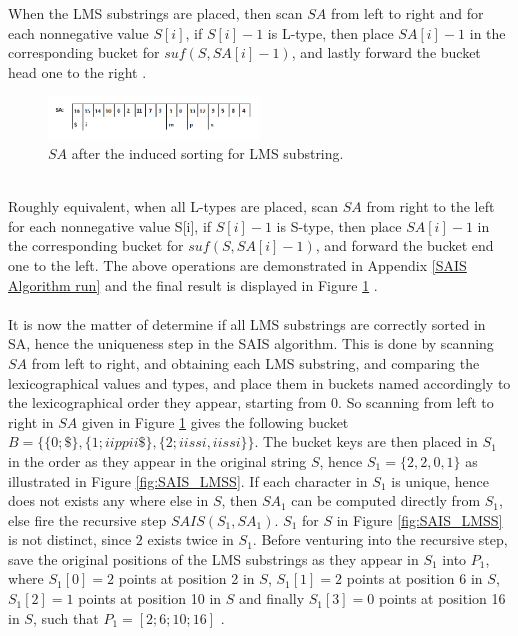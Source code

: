 \documentclass[12pt]{article} %
\begin{document}
When the LMS substrings are placed, then scan $SA$ from left to right and for each nonnegative value $S[i]$, if $S[i]-1$ is L-type, then place $SA[i]-1$ in the corresponding bucket for $suf(S, SA[i]-1)$, and lastly forward the bucket head one to the right \cite{twoeffecient}. 
\begin{figure}[H]
    \centering
    \includegraphics[width=0.5\textwidth]{SAIS_LMSfinal}
    \captionsetup{width=0.8\textwidth}
    \caption{$SA$ after the induced sorting for LMS substring.}
    \label{fig:SAIS_LMSfinal}
    
\end{figure}
\\
Roughly equivalent, when all L-types are placed, scan $SA$ from right to the left for each nonnegative value S[i], if $S[i]-1$ is S-type, then place $SA[i]-1$ in the corresponding bucket for $suf(S, SA[i]-1)$, and forward the bucket end one to the left. The above operations are demonstrated in Appendix \ref{SAIS Algorithm run} and the final result is displayed in Figure \ref{fig:SAIS_LMSfinal} \cite{twoeffecient}.
\\ \\
It is now the matter of determine if all LMS substrings are correctly sorted in SA, hence the uniqueness step in the SAIS algorithm. This is done by scanning $SA$ from left to right, and obtaining each LMS substring, and comparing the lexicographical values and types, and place them in buckets named accordingly to the lexicographical order they appear, starting from 0. So scanning from left to right in $SA$ given in Figure \ref{fig:SAIS_LMSfinal} gives the following bucket $B = \{\{0; \$\}, \{1; iippii\$\}, \{2; iissi, iissi\}\}$. The bucket keys are then placed in $S_1$ in the order as they appear in the original string $S$, hence $S_1 = \{2,2,0,1\}$ as illustrated in Figure \ref{fig:SAIS_LMSS}. If each character in $S_1$ is unique, hence does not exists any where else in $S$, then $SA_1$ can be computed directly from $S_1$, else fire the recursive step $SAIS(S_1, SA_1)$. $S_1$ for $S$ in Figure \ref{fig:SAIS_LMSS} is not distinct, since $2$ exists twice in $S_1$. Before venturing into the recursive step, save the original positions of the LMS substrings as they appear in $S_1$ into $P_1$, where $S_{1}[0] = 2$ points at position 2 in $S$,  $S_{1}[1] = 2$ points at position 6 in $S$, $S_{1}[2] = 1$ points at position 10 in $S$ and finally $S_{1}[3] = 0$ points at position 16 in $S$, such that $P_1=[2; 6; 10; 16]$ \cite{twoeffecient}.
\end{document}
